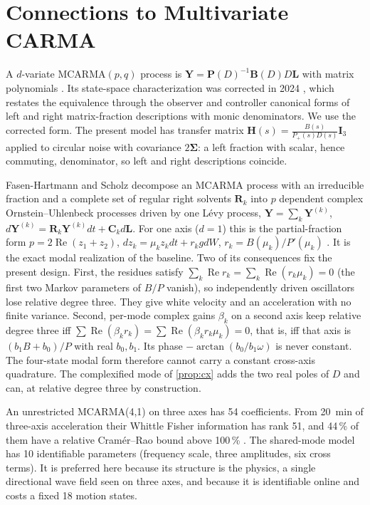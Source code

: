 \documentclass[conference]{IEEEtran}
\DeclareRobustCommand{\vct}[1]{\bm{#1}}
\DeclareRobustCommand{\mat}[1]{\bm{#1}}
\theoremstyle{bodysmall}
\begin{document}
\section{Connections to Multivariate CARMA}
A $d$-variate MCARMA$(p,q)$ process is $\vct Y=\mat P(D)^{-1}\mat B(D)D\vct L$
with matrix polynomials \cite{marquardt07}. Its state-space characterization
\cite{schlemm12} was corrected in 2024 \cite{stelzer24}, which restates the
equivalence through the observer and controller canonical forms of left and
right matrix-fraction descriptions with monic denominators. We use the
corrected form. The present model has transfer matrix
$\mat H(s)=\tfrac{B(s)}{P_+(s)D(s)}\mat I_3$ applied to circular noise with
covariance $2\mat\Sigma$: a left fraction with scalar, hence commuting,
denominator, so left and right descriptions coincide.

Fasen-Hartmann and Scholz \cite{fasen21} decompose an MCARMA process with an
irreducible fraction and a complete set of regular right solvents
$\mat R_k$ into $p$ dependent complex Ornstein--Uhlenbeck processes driven
by one L\'evy process, $\vct Y=\sum_k\vct Y^{(k)}$,
$d\vct Y^{(k)}=\mat R_k\vct Y^{(k)}dt+\mat C_kd\vct L$. For one axis
($d=1$) this is the partial-fraction form $p=2\operatorname{Re}(z_1+z_2)$,
$dz_k=\mu_kz_kdt+r_kgdW$, $r_k=B(\mu_k)/P'(\mu_k)$ \cite{brockwell11}. It is
the exact modal realization of the baseline. Two of its consequences fix the
present design. First, the residues satisfy
$\sum_k\operatorname{Re}r_k=\sum_k\operatorname{Re}(r_k\mu_k)=0$ (the first
two Markov parameters of $B/P$ vanish), so independently driven oscillators
lose relative degree three. They give white velocity and an acceleration
with no finite variance. Second, per-mode complex gains $\beta_k$ on a
second axis keep relative degree three iff
$\sum\operatorname{Re}(\beta_kr_k)=\sum\operatorname{Re}(\beta_kr_k\mu_k)=0$,
that is, iff that axis is $(b_1B+b_0)/P$ with real $b_0,b_1$. Its phase
$-\arctan(b_0/b_1\omega)$ is never constant. The four-state modal form
therefore cannot carry a constant cross-axis quadrature. The complexified mode
of \cref{prop:cx} adds the two real poles of $D$ and can, at relative degree
three by construction.

An unrestricted MCARMA(4,1) on three axes has 54 coefficients. From
\SI{20}{min} of three-axis acceleration their Whittle Fisher information has
rank 51, and 44\,\% of them have a relative Cram\'er--Rao bound above
100\,\% \cite{whittle53,fasen22}. The shared-mode model has 10
identifiable parameters (frequency scale, three amplitudes, six cross
terms). It is preferred here because its structure is the physics, a
single directional wave field seen on three axes, and because it is
identifiable online and costs a fixed 18 motion states.
\end{document}
